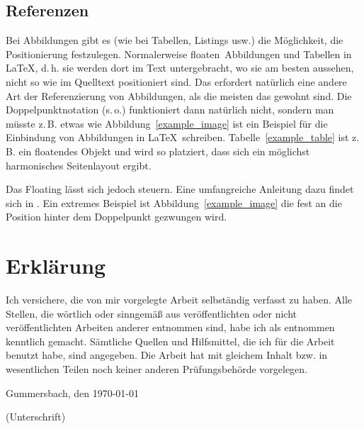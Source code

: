 \documentclass[12pt,oneside,a4paper,bibtotoc,liststotoc]{scrreprt}
\newcommand{\zB}{\mbox{z.\,B.}\xspace}
\newcommand{\dH}{\mbox{d.\,h.}\xspace}
\newcommand{\so}{\mbox{s.\,o.}\xspace}
\begin{document}
\section{Referenzen}

Bei Abbildungen gibt es (wie bei Tabellen, Listings usw.) die
Möglichkeit, die Positionierung festzulegen. Normalerweise \glqq
floaten\grqq\ Abbildungen und Tabellen in \LaTeX, \dH sie werden dort
im Text untergebracht, wo sie am besten aussehen, nicht so wie im
Quelltext positioniert sind. Das erfordert natürlich eine andere Art
der Referenzierung von Abbildungen, als die meisten das gewohnt
sind. Die Doppelpunktnotation (\so) funktioniert dann natürlich nicht,
sondern man müsste \zB etwas wie \glqq Abbildung~\ref{example_image}
ist ein Beispiel für die Einbindung von Abbildungen in \LaTeX \grqq\
schreiben. Tabelle~\ref{example_table} ist \zB ein floatendes Objekt
und wird so platziert, dass sich ein möglichst harmonisches
Seitenlayout ergibt.

Das Floating lässt sich jedoch steuern. Eine umfangreiche Anleitung
dazu findet sich in \cite[][]{WikibookFloats}. Ein extremes Beispiel
ist Abbildung~\ref{example_image} die fest an die Position hinter dem
Doppelpunkt gezwungen wird.

{}


\appendix

\chapter{Erklärung}

Ich versichere, die von mir vorgelegte Arbeit selbständig verfasst zu
haben. Alle Stellen, die wörtlich oder sinngemäß aus veröffentlichten
oder nicht veröffentlichten Arbeiten anderer entnommen sind, habe ich
als entnommen kenntlich gemacht. Sämtliche Quellen und Hilfsmittel,
die ich für die Arbeit benutzt habe, sind angegeben. Die Arbeit hat
mit gleichem Inhalt bzw. in wesentlichen Teilen noch keiner anderen
Prüfungsbehörde vorgelegen.

\bigskip

Gummersbach, den \today

\bigskip

\bigskip

\bigskip

\bigskip

\bigskip

\bigskip

(Unterschrift)
\end{document}
